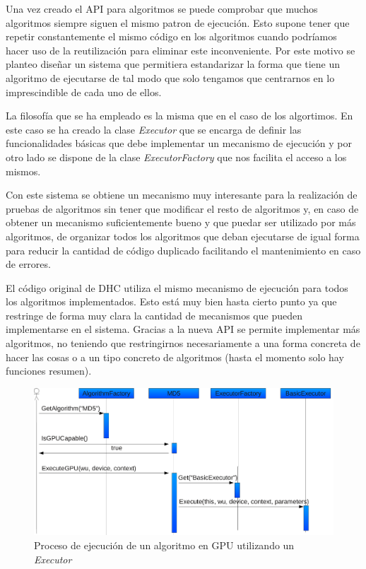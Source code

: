 Una vez creado el API para algoritmos se puede comprobar que muchos algoritmos siempre siguen el mismo patron de ejecución. Esto supone tener que repetir constantemente el mismo código en los algoritmos cuando podríamos hacer uso de la reutilización para eliminar este inconveniente. Por este motivo se planteo diseñar un sistema que permitiera estandarizar la forma que tiene un algoritmo de ejecutarse de tal modo que solo tengamos que centrarnos en lo imprescindible de cada uno de ellos.

La filosofía que se ha empleado es la misma que en el caso de los algortimos. En este caso se ha creado la clase \emph{Executor} que se encarga de definir las funcionalidades básicas que debe implementar un mecanismo de ejecución y por otro lado se dispone de la clase \emph{ExecutorFactory} que nos facilita el acceso a los mismos.

Con este sistema se obtiene un mecanismo muy interesante para la realización de pruebas de algoritmos sin tener que modificar el resto de algoritmos y, en caso de obtener un mecanismo suficientemente bueno y que puedar ser utilizado por más algoritmos, de organizar todos los algoritmos que deban ejecutarse de igual forma para reducir la cantidad de código duplicado facilitando el mantenimiento en caso de errores.

El código original de DHC utiliza el mismo mecanismo de ejecución para todos los algoritmos implementados. Esto está muy bien hasta cierto punto ya que restringe de forma muy clara la cantidad de mecanismos que pueden implementarse en el sistema. Gracias a la nueva API se permite implementar más algoritmos, no teniendo que restringirnos necesariamente a una forma concreta de hacer las cosas o a un tipo concreto de algoritmos (hasta el momento solo hay funciones resumen).

\begin{figure}
	\centering
	\includegraphics[width=1\textwidth]{images/executor.pdf}
	\caption{Proceso de ejecución de un algoritmo en GPU utilizando un \emph {Executor}}\label{fig:algotirmo_gpu_executor}
\end{figure}

